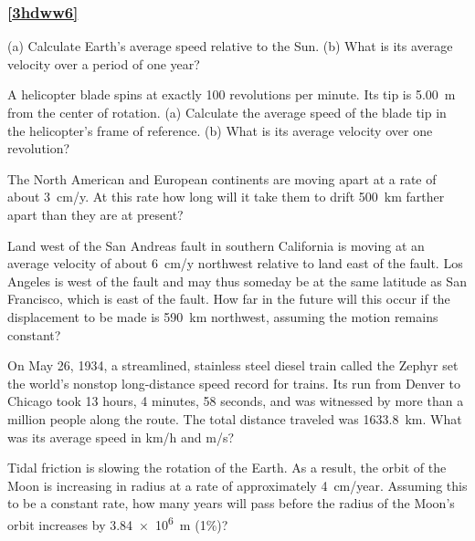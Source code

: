 \documentclass[dvipsnames]{article}
\begin{document}
\subsubsection*{\ref{3hdww6} }

\begin{exercise}
    (a) Calculate Earth's average speed relative to the Sun. (b) What is its average velocity over a period of one year?
\end{exercise}

\begin{exercise}
    A helicopter blade spins at exactly 100 revolutions per minute. Its tip is \SI{5.00}{m} from the center of rotation. (a) Calculate the average speed of the blade tip in the helicopter’s frame of reference. (b) What is its average velocity over one revolution?
\end{exercise}

\begin{exercise}
    The North American and European continents are moving apart at a rate of about \SI{3}{cm/y}. At this rate how long will it take them to drift \SI{500}{km} farther apart than they are at present?
\end{exercise}

\begin{exercise}
    Land west of the San Andreas fault in southern California is moving at an average velocity of about \SI{6}{cm/y} northwest relative to land east of the fault. Los Angeles is west of the fault and may thus someday be at the same latitude as San Francisco, which is east of the fault. How far in the future will this occur if the displacement to be made is \SI{590}{km} northwest, assuming the motion remains constant?
\end{exercise}

\begin{exercise}
    On May 26, 1934, a streamlined, stainless steel diesel train called the Zephyr set the world’s nonstop long-distance speed record for trains. Its run from Denver to Chicago took 13 hours, 4 minutes, 58 seconds, and was witnessed by more than a million people along the route. The total distance traveled was \SI{1633.8}{km}. What was its average speed in km/h and m/s?
\end{exercise}

\begin{exercise}
    Tidal friction is slowing the rotation of the Earth. As a result, the orbit of the Moon is increasing in radius at a rate of approximately \SI{4}{cm/year}. Assuming this to be a constant rate, how many years will pass before the radius of the Moon’s orbit increases by \SI{3.84e6}{m} (1\%)?
\end{exercise}
\end{document}
